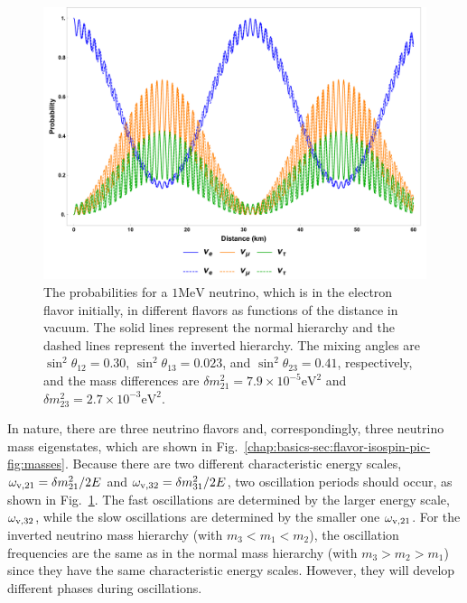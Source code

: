 \begin{figure}[htbp]
    \centering
    \includegraphics[width=\textwidth]{chapters/assets/basics/vacuum-oscillations-3-flavor.pdf}
    \caption{The probabilities for a $1\mathrm{MeV}$ neutrino, which is in the electron flavor initially, in different flavors as functions of the distance in vacuum. The solid lines represent the normal hierarchy and the dashed lines represent the inverted hierarchy. The mixing angles are $\sin^2\theta_{12}=0.30$, $\sin^2\theta_{13}=0.023$, and $\sin^2\theta_{23}=0.41$, respectively, and the mass differences are $\delta m_{21}^2 = 7.9\times 10^{-5}\mathrm{eV^2}$ and $\delta m^2_{23}=2.7\times 10^{-3}\mathrm{eV^2}$.}
    \label{chap:basics-section:neutrinos-fig:vacuum-3-flavor-osc}
\end{figure}


In nature, there are three neutrino flavors and, correspondingly, three neutrino mass eigenstates, which are shown in Fig.~\ref{chap:basics-sec:flavor-isospin-pic-fig:masses}. Because there are two different characteristic energy scales, $\omega_{\mathrm v,21}=\delta m_{21}^2/2E$ and $\omega_{\mathrm v,32}=\delta m_{31}^2/2E$, two oscillation periods should occur, as shown in Fig.~\ref{chap:basics-section:neutrinos-fig:vacuum-3-flavor-osc}. The fast oscillations are determined by the larger energy scale, $\omega_{\mathrm v,32}$, while the slow oscillations are determined by the smaller one $\omega_{\mathrm v,21}$. For the inverted neutrino mass hierarchy (with $m_3 < m_1 < m_2$), the oscillation frequencies are the same as in the normal mass hierarchy (with $m_3>m_2>m_1$) since they have the same characteristic energy scales. However, they will develop different phases during oscillations.

